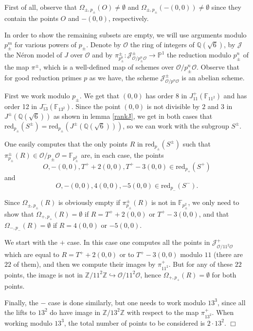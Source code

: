 \documentclass[a4paper,12pt]{amsart}
\theoremstyle{remark}
\theoremstyle{definition}
\newenvironment{pf}{\par\noindent{\bf Proof.}\enspace\ignorespaces}{{\hfill $\Box$}\par\par}
\begin{document}
\begin{pf} First of all, observe that
$\Omega_{\pm,p_{\pm}}(O)\ne \emptyset$ and
$\Omega_{\pm,p_{\pm}}(-(0,0))\ne \emptyset$ since they contain the
points $O$ and $-(0,0)$, respectively.

In order to show the remaining subsets are empty, we will use
arguments modulo $p_{\pm}^m$ for various powers of $p_{\pm}$. Denote
by ${{\mathcal{O}}}$ the ring of integers of ${{\mathbb{Q}}}(\sqrt{6})$, by ${{\mathcal{J}}}$ the
N{\'e}ron model of $J$ over ${{\mathcal{O}}}$ and by
$\pi^{\pm}_{p_{\pm}^n}:{{\mathcal{J}}}^{\pm}_{{{\mathcal{O}}}/p_{\pm}^n{{\mathcal{O}}}} \to {{\mathbb{P}}}^1$ the
reduction modulo $p_{\pm}^n$ of the map $\pi^{\pm}$, which is a
well-defined map of schemes over ${{\mathcal{O}}}/p_{\pm}^n{{\mathcal{O}}}$. Observe that
for good reduction primes $p$ as we have, the scheme
${{\mathcal{J}}}^{\pm}_{{{\mathcal{O}}}/p^n{{\mathcal{O}}}}$ is an abelian scheme.

First we work modulo $p_{\pm}$. We get that $(0,0)$ has order $8$
in $J^+_{11}({{\mathbb{F}}}_{11^2})$ and has order 12 in
$J^-_{13}({{\mathbb{F}}}_{13^2})$. Since the point $(0,0)$ is not divisible
by $2$ and $3$ in $J^{\pm}({{\mathbb{Q}}}(\sqrt{6}))$ as shown in lemma
\ref{rankJ}, we get in both cases that
$\mbox{red}_{p_{\pm}}(S^{\pm})=\mbox{red}_{p_{\pm}}(J^{\pm}({{\mathbb{Q}}}(\sqrt{6})))$,
so we can work with the subgroup $S^{\pm}$.

One easily computes that the only points $R$ in
$\mbox{red}_{p_{\pm}}(S^{\pm})$ such that $\pi^{\pm}_{p_{\pm}}(R)\in
{{\mathcal{O}}}/{p_{\pm}}{{\mathcal{O}}}={{\mathbb{F}}}_{p_{\pm}^2}$ are, in each case, the points
$$O, -(0,0), T^++2(0,0), T^+-3(0,0) \in \mbox{red}_{p_+}(S^{+}) $$
and
$$O, -(0,0), 4(0,0),-5(0,0)\in \mbox{red}_{p_-}(S^{-}).$$

Since $\Omega_{\pm,p_{\pm}}(R)$ is obviously empty if
$\pi^{\pm}_{p_{\pm}}(R)$ is not in ${{\mathbb{F}}}_{p_{\pm}^2}$, we only need to
show that $\Omega_{+,p_{+}}(R) = \emptyset$ if $R=T^++2(0,0)$ or
$T^+-3(0,0)$, and that $\Omega_{-,p_{-}}(R) = \emptyset$ if
$R=4(0,0)$ or $-5(0,0)$.

We start with the $+$ case. In this case one computes all the
points in ${{\mathcal{J}}}^+_{{{\mathcal{O}}}/11^2{{\mathcal{O}}}}$ which are equal to $R=T^++2(0,0)$
or to $T^+-3(0,0)$ modulo $11$ (there are $22$ of them), and then
we compute their images by $\pi^+_{11^2}$. But for any of these
$22$ points, the image is not in ${{\mathbb{Z}}}/11^2{{\mathbb{Z}}} \hookrightarrow
{{\mathcal{O}}}/11^2{{\mathcal{O}}}$, hence $\Omega_{+,p_{+}}(R) = \emptyset$ for both
points.

Finally, the $-$ case is done similarly, but one needs to work
modulo $13^3$, since all the lifts to $13^2$ do have image in
${{\mathbb{Z}}}/13^2{{\mathbb{Z}}}$ with respect to the map $\pi^+_{13^2}$. When working
modulo $13^3$, the total number of points to be considered is
$2\cdot 13^2$.
\end{pf}
\end{document}
